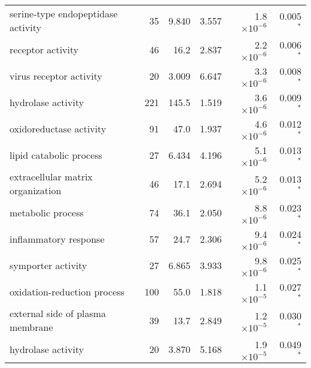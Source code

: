 \begin{longtable}{|l|r|r|r|r|r|}
                serine-type endopeptidase activity &                      35 &                   9.840 &      3.557 &  1.8$\times 10^{-6}$ &                0.005$\bm{^*}$ \\
                                 receptor activity &                      46 &                    16.2 &      2.837 &  2.2$\times 10^{-6}$ &                0.006$\bm{^*}$ \\
                           virus receptor activity &                      20 &                   3.009 &      6.647 &  3.3$\times 10^{-6}$ &                0.008$\bm{^*}$ \\
                                hydrolase activity &                     221 &                   145.5 &      1.519 &  3.6$\times 10^{-6}$ &                0.009$\bm{^*}$ \\
                           oxidoreductase activity &                      91 &                    47.0 &      1.937 &  4.6$\times 10^{-6}$ &                0.012$\bm{^*}$ \\
                           lipid catabolic process &                      27 &                   6.434 &      4.196 &  5.1$\times 10^{-6}$ &                0.013$\bm{^*}$ \\
                 extracellular matrix organization &                      46 &                    17.1 &      2.694 &  5.2$\times 10^{-6}$ &                0.013$\bm{^*}$ \\
                                 metabolic process &                      74 &                    36.1 &      2.050 &  8.8$\times 10^{-6}$ &                0.023$\bm{^*}$ \\
                             inflammatory response &                      57 &                    24.7 &      2.306 &  9.4$\times 10^{-6}$ &                0.024$\bm{^*}$ \\
                                symporter activity &                      27 &                   6.865 &      3.933 &  9.8$\times 10^{-6}$ &                0.025$\bm{^*}$ \\
                       oxidation-reduction process &                     100 &                    55.0 &      1.818 &  1.1$\times 10^{-5}$ &                0.027$\bm{^*}$ \\
                  external side of plasma membrane &                      39 &                    13.7 &      2.849 &  1.2$\times 10^{-5}$ &                0.030$\bm{^*}$ \\
                                hydrolase activity &                      20 &                   3.870 &      5.168 &  1.9$\times 10^{-5}$ &                0.049$\bm{^*}$ \\

\end{longtable}
